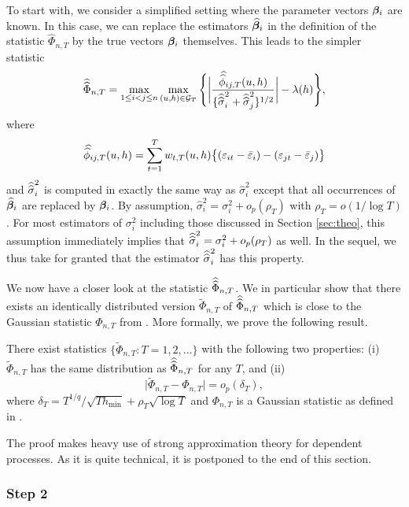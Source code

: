 \documentclass[12pt]{article}
\makeatletter
\renewcommand{\eqref}[1]{\tagform@{\ref{#1}}}
\makeatother
\begin{document}
To start with, we consider a simplified setting where the parameter vectors $\bm{\beta}_i$ are known. In this case, we can replace the estimators $\widehat{\bm{\beta}}_i$ in the definition of the statistic $\widehat{\Phi}_{n,T}$ by the true vectors $\bm{\beta}_i$ themselves. This leads to the simpler statistic 
\[ \doublehattwo{\Phi}_{n,T} = \max_{1 \le i < j \le n} \max_{(u,h) \in \mathcal{G}_T}\Bigg\{ \bigg| \frac{\doublehat{\phi}_{ij,T}(u,h)} {\{ \doublehattwo{\sigma}_i^2 + \doublehattwo{\sigma}_j^2 \}^{1/2}} \bigg| - \lambda(h)\Bigg\}, \]
where
\[ \doublehat{\phi}_{ij,T}(u,h) = \sum_{t=1}^T w_{t,T}(u,h) \big\{ (\varepsilon_{it} - \bar{\varepsilon}_i) - (\varepsilon_{jt} - \bar{\varepsilon}_j)  \big\} \]
and $\widehat{\widehat{\sigma}}_i^2$ is computed in exactly the same way as $\widehat{\sigma}_i^2$ except that all occurrences of $\widehat{\bm{\beta}}_i$ are replaced by $\bm{\beta}_i$. By assumption, $\widehat{\sigma}_i^2 = \sigma^2_i + o_p(\rho_T)$ with $\rho_T = o(1/\log T)$. For most estimators of $\sigma_i^2$ including those discussed in Section \ref{sec:theo}, this assumption immediately implies that $\widehat{\widehat{\sigma}}_i^2 = \sigma^2_i + o_p(\rho_T)$ as well. In the sequel, we thus take for granted that the estimator $\widehat{\widehat{\sigma}}_i^2$ has this property.


We now have a closer look at the statistic $\widehat{\widehat{\Phi}}_{n,T}$. We in particular show that there exists an identically distributed version $\widetilde{\Phi}_{n, T}$ of $\widehat{\widehat{\Phi}}_{n, T}$ which is close to the Gaussian statistic $\Phi_{n, T}$ from \eqref{eq:Phi}. More formally, we prove the following result.  
\begin{propA}\label{propA:strong_approx}
There exist statistics $\{ \widetilde{\Phi}_{n,T}: T =1,2,\ldots \}$ with the following two properties: (i) $\widetilde{\Phi}_{n, T}$ has the same distribution as $\widehat{\widehat{\Phi}}_{n, T}$ for any $T$, and (ii)
\begin{equation*}
\big| \widetilde{\Phi}_{n, T} - \Phi_{n,T} \big| = o_p(\delta_T),
\end{equation*}
where $\delta_T = T^{1/q} / \sqrt{T h_{\min}} + \rho_T \sqrt{\log T}$ and $\Phi_{n,T}$ is a Gaussian statistic as defined in \eqref{eq:Phi}. 
\end{propA}
The proof makes heavy use of strong approximation theory for dependent processes. As it is quite technical, it is postponed to the end of this section. 


\subsubsection*{Step 2}
\end{document}
